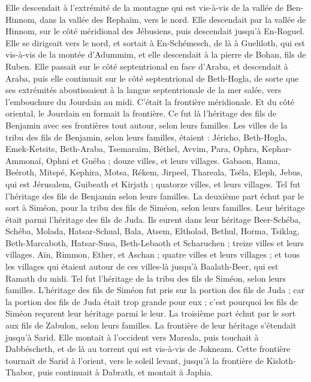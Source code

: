 \begin{multicols}{2}
Elle descendait à l’extrémité de la montagne qui est vis-à-vis de la vallée de Ben-Hinnom, dans la vallée des Rephaïm, vers le nord. Elle descendait par la vallée de Hinnom, sur le côté méridional des Jébusiens, puis descendait jusqu’à En-Roguel.
Elle se dirigeait vers le nord, et sortait à En-Schémesch, de là à Gueliloth, qui est vis-à-vis de la montée d’Adummim, et elle descendait à la pierre de Bohan, fils de Ruben.
Elle passait sur le côté septentrional en face d’Araba, et descendait à Araba,
puis elle continuait sur le côté septentrional de Beth-Hogla, de sorte que ses extrémités aboutissaient à la langue septentrionale de la mer salée, vers l’embouchure du Jourdain au midi. C’était la frontière méridionale.
Et du côté oriental, le Jourdain en formait la frontière. Ce fut là l’héritage des fils de Benjamin avec ses frontières tout autour, selon leurs familles.
Les villes de la tribu des fils de Benjamin, selon leurs familles, étaient : Jéricho, Beth-Hogla, Emek-Ketsits,
Beth-Araba, Tsemaraïm, Béthel,
Avvim, Para, Ophra,
Kephar-Ammonaï, Ophni et Guéba ; douze villes, et leurs villages.
Gabaon, Rama, Beéroth,
Mitspé, Kephira, Motsa,
Rékem, Jirpeel, Thareala,
Tséla, Eleph, Jebus, qui est Jérusalem, Guibeath et Kirjath ; quatorze villes, et leurs villages. Tel fut l’héritage des fils de Benjamin selon leurs familles.
\VerseOne{}La deuxième part échut par le sort à Siméon, pour la tribu des fils de Siméon, selon leurs familles. Leur héritage était parmi l’héritage des fils de Juda.
Ils eurent dans leur héritage Beer-Schéba, Schéba, Molada,
Hatsar-Schual, Bala, Atsem,
Eltholad, Bethul, Horma,
Tsiklag, Beth-Marcaboth, Hatsar-Susa,
Beth-Lebaoth et Scharuchen ; treize villes et leurs villages.
Aïn, Rimmon, Ether, et Aschan ; quatre villes et leurs villages ;
et tous les villages qui étaient autour de ces villes-là jusqu’à Baalath-Beer, qui est Ramath du midi. Tel fut l’héritage de la tribu des fils de Siméon, selon leurs familles.
L’héritage des fils de Siméon fut pris sur la portion des fils de Juda ; car la portion des fils de Juda était trop grande pour eux ; c’est pourquoi les fils de Siméon reçurent leur héritage parmi le leur.
La troisième part échut par le sort aux fils de Zabulon, selon leurs familles.
La frontière de leur héritage s’étendait jusqu’à Sarid. Elle montait à l’occident vers Mareala, puis touchait à Dabbéscheth, et de là au torrent qui est vis-à-vis de Jokneam.
Cette frontière tournait de Sarid à l’orient, vers le soleil levant, jusqu’à la frontière de Kisloth-Thabor, puis continuait à Dabrath, et montait à Japhia.

\end{multicols}
